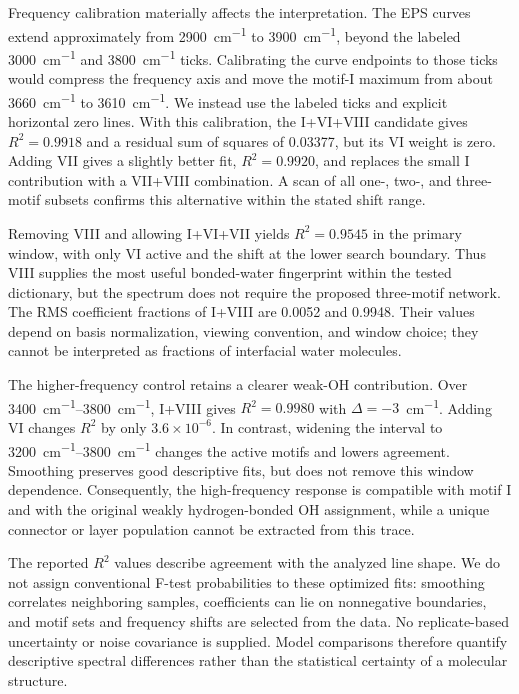 \documentclass[aip,jcp,reprint,amsmath,amssymb]{revtex4-2}
\begin{document}
Frequency calibration materially affects the interpretation. The EPS curves extend approximately from \SI{2900}{cm^{-1}} to \SI{3900}{cm^{-1}}, beyond the labeled \SI{3000}{cm^{-1}} and \SI{3800}{cm^{-1}} ticks. Calibrating the curve endpoints to those ticks would compress the frequency axis and move the motif-I maximum from about \SI{3660}{cm^{-1}} to \SI{3610}{cm^{-1}}. We instead use the labeled ticks and explicit horizontal zero lines. With this calibration, the I+VI+VIII candidate gives $R^2=0.9918$ and a residual sum of squares of 0.03377, but its VI weight is zero. Adding VII gives a slightly better fit, $R^2=0.9920$, and replaces the small I contribution with a VII+VIII combination. A scan of all one-, two-, and three-motif subsets confirms this alternative within the stated shift range.

Removing VIII and allowing I+VI+VII yields $R^2=0.9545$ in the primary window, with only VI active and the shift at the lower search boundary. Thus VIII supplies the most useful bonded-water fingerprint within the tested dictionary, but the spectrum does not require the proposed three-motif network. The RMS coefficient fractions of I+VIII are 0.0052 and 0.9948. Their values depend on basis normalization, viewing convention, and window choice; they cannot be interpreted as fractions of interfacial water molecules.

The higher-frequency control retains a clearer weak-OH contribution. Over \SIrange{3400}{3800}{cm^{-1}}, I+VIII gives $R^2=0.9980$ with $\Delta=-3$~\si{cm^{-1}}. Adding VI changes $R^2$ by only $3.6\times10^{-6}$. In contrast, widening the interval to \SIrange{3200}{3800}{cm^{-1}} changes the active motifs and lowers agreement. Smoothing preserves good descriptive fits, but does not remove this window dependence. Consequently, the high-frequency response is compatible with motif I and with the original weakly hydrogen-bonded OH assignment,\cite{Cyran2019PNAS} while a unique connector or layer population cannot be extracted from this trace.

The reported $R^2$ values describe agreement with the analyzed line shape. We do not assign conventional F-test probabilities to these optimized fits: smoothing correlates neighboring samples, coefficients can lie on nonnegative boundaries, and motif sets and frequency shifts are selected from the data. No replicate-based uncertainty or noise covariance is supplied. Model comparisons therefore quantify descriptive spectral differences rather than the statistical certainty of a molecular structure.
\end{document}
